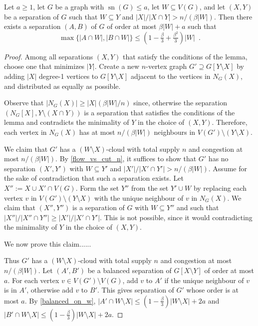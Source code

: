 \documentclass{patmorin}
\DeclareMathOperator{\sep}{sn}
\begin{document}
\begin{lem}
  Let $a\ge 1$, let $G$ be a graph with $\sep(G)\le a$, let $W\subseteq V(G)$, and let $(X,Y)$ be a separation of $G$ such that $W\subseteq Y$ and $|X|/|X\cap Y| > n/(\beta|W|)$.  Then there exists a separation $(A,B)$ of $G$ of order at most $\beta|W|+a$ such that
  \[
  \max\{|A\cap W|,|B\cap W|\}\le \left(1-\tfrac{\beta}{3}+\tfrac{\beta^2}{3}\right)|W| \enspace .
  \]
\end{lem}

\begin{proof}
  Among all separations $(X,Y)$ that satisfy the conditions of the lemma, choose one that minimizes $|Y|$. Create a new $n$-vertex graph $G'\supseteq G[Y\setminus X]$ by adding $|X|$ degree-1 vertices to $G[Y\setminus X]$ adjacent to the vertices in $N_G(X)$, and distributed as equally as possible.

  Observe that $|N_G(X)|\ge |X|(\beta|W|/n)$ since, otherwise the separation $(N_G[X],Y\setminus(X\cap Y))$ is a separation that satisfies the conditions of the lemma and contradicts the minimality of $Y$ in the choice of $(X,Y)$.  Therefore, each vertex in $N_G(X)$ has at most $n/(\beta|W|)$ neighbours in $V(G')\setminus (Y\setminus X)$.

  We claim that $G'$ has a $(W\setminus X)$-cloud with total supply $n$ and congestion at most $n/(\beta|W|)$.  By \cref{flow_vs_cut_n}, it suffices to show that $G'$ has no separation $(X',Y')$ with $W\subseteq Y'$ and $|X'|/|X'\cap Y'|>n/(\beta|W|)$.  Assume for the sake of contradiction that such a separation exists.  Let $X'':=X\cup X'\cap V(G)$.  Form the set $Y''$ from the set $Y'\cup W$ by replacing each vertex $v$ in $V(G')\setminus (Y\setminus X)$ with the unique neighbour of $v$ in $N_G(X)$.  We claim that $(X'',Y'')$ is a separation of $G$ with $W\subseteq Y''$ and such that $|X''|/|X''\cap Y''|\ge |X'|/|X'\cap Y'|$.  This is not possible, since it would contradicting the minimality of $Y$ in the choice of $(X,Y)$.

  We now prove this claim......

  Thus $G'$ has a $(W\setminus X)$-cloud with total supply $n$ and congestion at most $n/(\beta|W|)$.  Let $(A',B')$ be a balanced separation of $G[X\setminus Y]$ of order at most $a$.  For each vertex $v\in V(G')\setminus V(G)$, add $v$ to $A'$ if the unique neighbour of $v$ is in $A'$, otherwise add $v$ to $B'$.  This gives separation of $G'$ whose order is at most $a$.  By \cref{balanced_on_w}, $|A'\cap W\setminus X|\le (1-\tfrac{\beta}{3})|W\setminus X|+2a$ and $|B'\cap W\setminus X|\le (1-\tfrac{\beta}{3})|W\setminus X|+2a$.


\end{proof}
\end{document}
